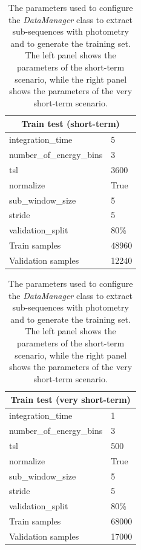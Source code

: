 \begin{table}[]
\centering
\begin{tabular}{|l|l|}
\hline
\multicolumn{2}{|c|}{\textbf{Train test (short-term)}} \\
\hline
integration\_time  & 5 \\ 
number\_of\_energy\_bins & 3 \\ 
tsl & 3600 \\ 
normalize & True \\ 
sub\_window\_size & 5 \\ 
stride & 5 \\ 
validation\_split & 80\% \\ 
Train samples & 48960 \\ 
Validation samples & 12240 \\ \hline
\end{tabular}
\quad
\begin{tabular}{|l|l|}
\hline
\multicolumn{2}{|c|}{\textbf{Train test (very short-term)}} \\
\hline
integration\_time  & 1 \\ 
number\_of\_energy\_bins & 3 \\ 
tsl & 500 \\ 
normalize & True \\ 
sub\_window\_size & 5 \\ 
stride & 5 \\ 
validation\_split & 80\% \\
Train samples & 68000 \\ 
Validation samples & 17000 \\ \hline
\end{tabular}
\caption{The parameters used to configure the \textit{DataManager} class to extract sub-sequences with photometry and to generate the training set. The left panel shows the parameters of the short-term scenario, while the right panel shows the parameters of the very short-term scenario.}
\label{tab:training-set-ts}
\end{table}

